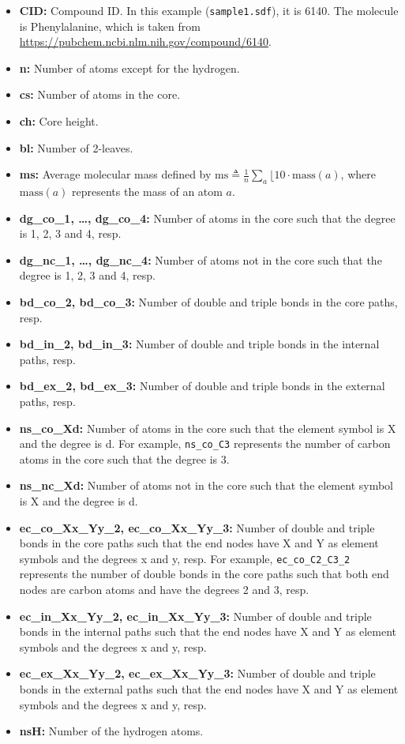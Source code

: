 \documentclass[11pt,titlepage,dvipdfmx,twoside]{book}
\begin{document}
\begin{itemize}
\item {\bf CID:} Compound ID. In this example ({\tt sample1.sdf}), it is 6140. The molecule is Phenylalanine, which is taken from \url{https://pubchem.ncbi.nlm.nih.gov/compound/6140}.
\item {\bf n:}  Number of atoms except for the hydrogen.
\item {\bf cs:} Number of atoms in the core.
\item {\bf ch:} Core height.
\item {\bf bl:} Number of 2-leaves.
\item {\bf ms:} Average molecular mass defined by $\textrm{ms}\triangleq\frac{1}{n}\sum_{a}\lfloor 10 \cdot \textrm{mass}(a)$, where $\textrm{mass}(a)$ represents the mass of an atom $a$.
\item {\bf dg\_co\_1, \dots, dg\_co\_4:} Number of atoms in the core such that the degree is 1, 2, 3 and 4, resp.
\item {\bf dg\_nc\_1, \dots, dg\_nc\_4:} Number of atoms not in the core such that the degree is 1, 2, 3 and 4, resp.
\item {\bf bd\_co\_2, bd\_co\_3:} Number of double and triple bonds in the core paths, resp.
\item {\bf bd\_in\_2, bd\_in\_3:} Number of double and triple bonds in the internal paths, resp.
\item {\bf bd\_ex\_2, bd\_ex\_3:} Number of double and triple bonds in the external paths, resp.
\item {\bf ns\_co\_Xd:} Number of atoms in the core such that the element symbol is X and the degree is d. For example, {\tt ns\_co\_C3} represents the number of carbon atoms in the core such that the degree is 3. 
\item {\bf ns\_nc\_Xd:} Number of atoms not in the core such that the element symbol is X and the degree is d.
\item {\bf ec\_co\_Xx\_Yy\_2, ec\_co\_Xx\_Yy\_3:} Number of double and triple bonds in the core paths such that the end nodes have X and Y as element symbols and the degrees x and y, resp. For example, {\tt ec\_co\_C2\_C3\_2} represents the number of double bonds in the core paths such that both end nodes are carbon atoms and have the degrees 2 and 3, resp. 
\item {\bf ec\_in\_Xx\_Yy\_2, ec\_in\_Xx\_Yy\_3:}
  Number of double and triple bonds in the internal paths such that the end nodes have X and Y as element symbols and the degrees x and y, resp.
\item {\bf ec\_ex\_Xx\_Yy\_2, ec\_ex\_Xx\_Yy\_3:}
  Number of double and triple bonds in the external paths such that the end nodes have X and Y as element symbols and the degrees x and y, resp.
\item {\bf nsH:} Number of the hydrogen atoms. 
\end{itemize}
\end{document}
